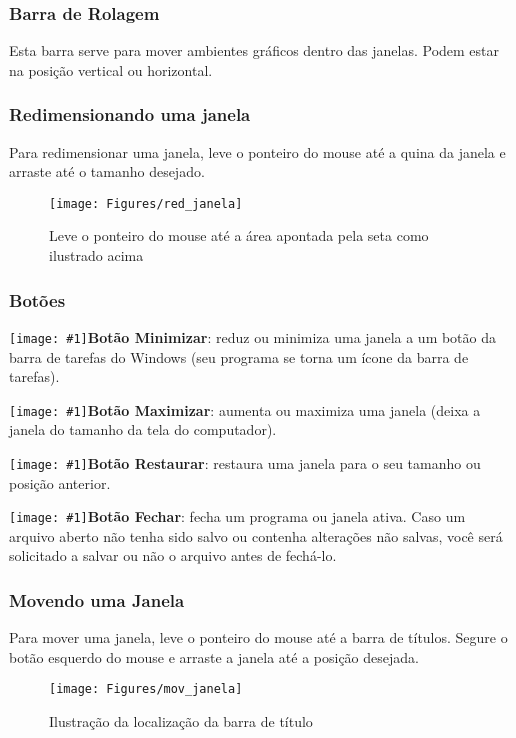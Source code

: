 \documentclass[hidelinks,12pt]{article}
\newcommand{\icon}[1]{\texttt{[image: \#1]}}
\begin{document}
\subsubsection{Barra de Rolagem}
Esta barra serve para mover ambientes gráficos dentro das janelas. Podem estar na posição vertical ou horizontal.

\subsubsection{Redimensionando uma janela}
Para redimensionar uma janela, leve o ponteiro do mouse até a quina da janela e arraste até o tamanho desejado.

\begin{figure}[!h]
	\centering
	\texttt{[image: Figures/red\_janela]}
	\caption{Leve o ponteiro do mouse até a área apontada pela seta como ilustrado acima}
	\label{fig:redimensionando janela}
\end{figure}


\subsubsection{Botões}

\noindent \icon{Figures/minimizar}{\bf Botão Minimizar}: reduz ou minimiza uma janela a um botão da barra de tarefas do Windows (seu programa se torna um ícone da barra de tarefas).

\noindent\icon{Figures/maximizar}{\bf Botão Maximizar}: aumenta ou maximiza uma janela (deixa a janela do tamanho da tela do computador).

\noindent\icon{Figures/restaurar}{\bf Botão Restaurar}: restaura uma janela para o seu tamanho ou posição anterior.

\noindent\icon{Figures/fechar}{\bf Botão Fechar}: fecha um programa ou janela ativa. Caso um arquivo aberto não tenha sido salvo ou contenha alterações não salvas, você será solicitado a salvar ou não o arquivo antes de fechá-lo.

\subsubsection{Movendo uma Janela}

Para mover uma janela, leve o ponteiro do mouse até a barra de títulos. Segure o botão esquerdo do mouse e arraste a janela até a posição desejada.

\begin{figure}[!h]
	\centering
	\texttt{[image: Figures/mov\_janela]}
	\caption{Ilustração da localização da barra de título}
	\label{fig:movendo janela}
\end{figure}
\end{document}
